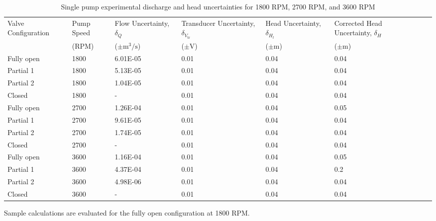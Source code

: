 \begin{table}[H]
    \centering
    \caption{Single pump experimental discharge and head uncertainties for 1800 RPM, 2700 RPM, and 3600 RPM}
    \label{tab:single_pump_discharge_and_head_uncertainty}
    \begin{tabular}{lC{0.15\textwidth}C{0.10\textwidth}C{0.10\textwidth}C{0.10\textwidth}C{0.15\textwidth}C{0.10\textwidth}}
        \toprule
        Valve Configuration & Pump Speed & Flow Uncertainty, $\delta_Q$ & Transducer Uncertainty, $\delta_{V_{\text{tr}}}$ & Head Uncertainty, $\delta_{H_t}$ & Corrected Head Uncertainty, $\delta_{H}$ \\
        & (RPM) & ($\pm\unit{\meter\cubed\per\second}$) & ($\pm$V) & ($\pm$m) & ($\pm$m) \\
        \midrule
        Fully open & 1800 & 6.01E-05 & 0.01 & 0.04 & 0.04 \\
        Partial 1 & 1800 & 5.13E-05 & 0.01 & 0.04 & 0.04 \\
        Partial 2 & 1800 & 1.04E-05 & 0.01 & 0.04 & 0.04 \\
        Closed & 1800 & - & 0.01 & 0.04 & 0.04 \\
        Fully open & 2700 & 1.26E-04 & 0.01 & 0.04 & 0.05 \\
        Partial 1 & 2700 & 9.61E-05 & 0.01 & 0.04 & 0.04 \\
        Partial 2 & 2700 & 1.74E-05 & 0.01 & 0.04 & 0.04 \\
        Closed & 2700 & - & 0.01 & 0.04 & 0.04 \\
        Fully open & 3600 & 1.16E-04 & 0.01 & 0.04 & 0.05 \\
        Partial 1 & 3600 & 4.37E-04 & 0.01 & 0.04 & 0.2 \\
        Partial 2 & 3600 & 4.98E-06 & 0.01 & 0.04 & 0.04 \\
        Closed & 3600 & - & 0.01 & 0.04 & 0.04 \\
        \bottomrule
    \end{tabular}
\end{table}
Sample calculations are evaluated for the fully open configuration at 1800 RPM.

